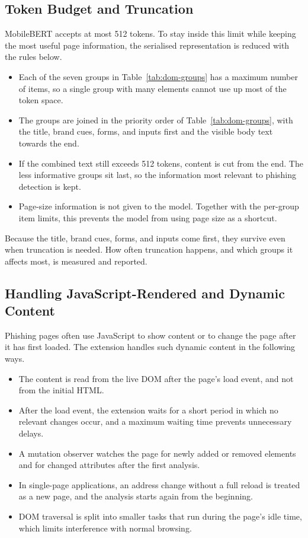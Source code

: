 \documentclass{FastFyp}
\begin{document}
\subsection{Token Budget and Truncation}
\label{sec:token-budget}
MobileBERT accepts at most 512 tokens. To stay inside this limit while keeping the most useful page information, the serialised representation is reduced with the rules below.
\begin{itemize}
    \item Each of the seven groups in Table~\ref{tab:dom-groups} has a maximum number of items, so a single group with many elements cannot use up most of the token space.
    \item The groups are joined in the priority order of Table~\ref{tab:dom-groups}, with the title, brand cues, forms, and inputs first and the visible body text towards the end.
    \item If the combined text still exceeds 512 tokens, content is cut from the end. The less informative groups sit last, so the information most relevant to phishing detection is kept.
    \item Page-size information is not given to the model. Together with the per-group item limits, this prevents the model from using page size as a shortcut.
\end{itemize}
Because the title, brand cues, forms, and inputs come first, they survive even when truncation is needed. How often truncation happens, and which groups it affects most, is measured and reported.

\subsection{Handling JavaScript-Rendered and Dynamic Content}
\label{sec:js-dynamic}
Phishing pages often use JavaScript to show content or to change the page after it has first loaded. The extension handles such dynamic content in the following ways.
\begin{itemize}
    \item The content is read from the live DOM after the page's load event, and not from the initial HTML.
    \item After the load event, the extension waits for a short period in which no relevant changes occur, and a maximum waiting time prevents unnecessary delays.
    \item A mutation observer watches the page for newly added or removed elements and for changed attributes after the first analysis.
    \item In single-page applications, an address change without a full reload is treated as a new page, and the analysis starts again from the beginning.
    \item DOM traversal is split into smaller tasks that run during the page's idle time, which limits interference with normal browsing.
\end{itemize}
\end{document}
